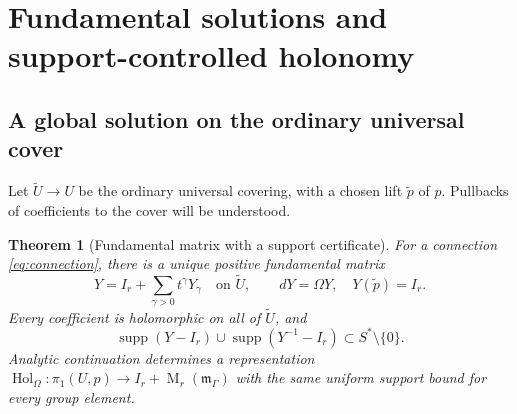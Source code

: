 \documentclass[11pt,letterpaper]{article}
\numberwithin{equation}{section}
\newtheorem{theorem}{Theorem}[section]
\theoremstyle{definition}
\theoremstyle{remark}
\newcommand{\mm}{\mathfrak m}
\newcommand{\supp}{\operatorname{supp}}
\newcommand{\Hol}{\operatorname{Hol}}
\newcommand{\Mat}{\operatorname{M}}
\begin{document}
\section{Fundamental solutions and support-controlled holonomy}
\label{sec:holonomy}

\subsection{A global solution on the ordinary universal cover}
Let $\widetilde U\to U$ be the ordinary universal covering, with a chosen lift
$\widetilde p$ of $p$. Pullbacks of coefficients to the cover will be
understood.

\begin{theorem}[Fundamental matrix with a support certificate]
\label{thm:fundamental}
For a connection \eqref{eq:connection}, there is a unique positive
fundamental matrix
\[
 Y=I_r+\sum_{\gamma>0}t^\gamma Y_\gamma
 \quad\text{on }\widetilde U,
 \qquad dY=\Omega Y,\quad Y(\widetilde p)=I_r.
\]
Every coefficient is holomorphic on all of $\widetilde U$, and
\[
 \supp(Y-I_r)\cup\supp(Y^{-1}-I_r)\subset S^*\setminus\{0\}.
\]
Analytic continuation determines a representation
$\Hol_\Omega:\pi_1(U,p)\to I_r+\Mat_r(\mm_\Gamma)$ with the same uniform
support bound for every group element.
\end{theorem}
\end{document}
